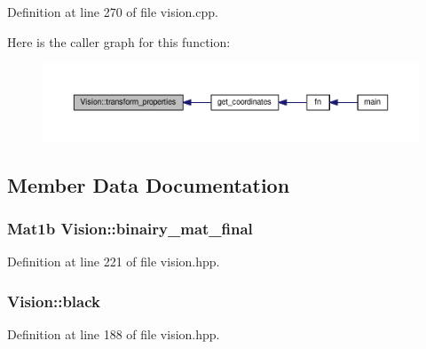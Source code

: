Definition at line 270 of file vision.\+cpp.



Here is the caller graph for this function\+:\nopagebreak
\begin{figure}[H]
\begin{center}
\leavevmode
\includegraphics[width=350pt]{class_vision_acd6cf5d0e7bba1adfb6f123d76489a6d_icgraph}
\end{center}
\end{figure}




\subsection{Member Data Documentation}
\subsubsection[{\texorpdfstring{binairy\+\_\+mat\+\_\+final}{binairy_mat_final}}]{\setlength{\rightskip}{0pt plus 5cm}Mat1b Vision\+::binairy\+\_\+mat\+\_\+final\hspace{0.3cm}{\ttfamily [private]}}\hypertarget{class_vision_a6509080d46e25f85776c843c08ef4f76}{}\label{class_vision_a6509080d46e25f85776c843c08ef4f76}


Definition at line 221 of file vision.\+hpp.

\subsubsection[{\texorpdfstring{black}{black}}]{ Vision\+::black\hspace{0.3cm}{\ttfamily [private]}}\hypertarget{class_vision_adc52ed0340e54fb14c8a3f397ec0bbc0}{}\label{class_vision_adc52ed0340e54fb14c8a3f397ec0bbc0}


Definition at line 188 of file vision.\+hpp.

